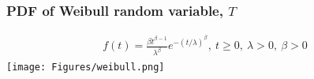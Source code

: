 %

\begin{frame}
\frametitle{PDF of Weibull random variable, $T$}
\begin{eqnarray}
f(t)=\frac{\beta t^{\beta-1}}{\lambda^{\beta}}e^{-(t/\lambda)^\beta},~t \geq 0,~\lambda > 0,~\beta > 0 \nonumber
\end{eqnarray}
\texttt{[image: Figures/weibull.png]}
\end{frame}

